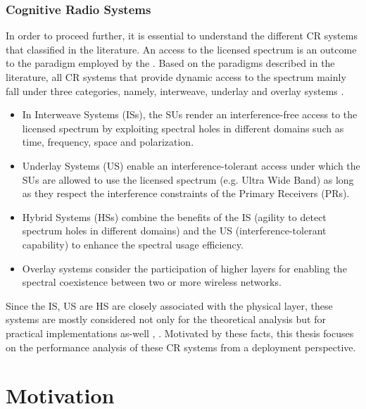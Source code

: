 \subsubsection*{Cognitive Radio Systems}
In order to proceed further, it is essential to understand the different CR systems that classified in the literature. An access to the licensed spectrum is an outcome to the paradigm employed by the . Based on the paradigms described in the literature, all CR systems that provide dynamic access to the spectrum mainly fall under three categories, namely, interweave, underlay and overlay systems \cite{Goldsmith09}. 
\begin{itemize}
\item In Interweave Systems (ISs), the SUs render an interference-free access to the licensed spectrum by exploiting spectral holes in different domains such as time, frequency, space and polarization. 
\item Underlay Systems (US) enable an interference-tolerant access under which the SUs are allowed to use the licensed spectrum (e.g. Ultra Wide Band) as long as they respect the interference constraints of the Primary Receivers (PRs). 
\item Hybrid Systems (HSs) combine the benefits of the IS (agility to detect spectrum holes in different domains) and the US (interference-tolerant capability) to enhance the spectral usage efficiency.  
\item Overlay systems consider the participation of higher layers for enabling the spectral coexistence between two or more wireless networks. 
\end{itemize}
Since the IS, US are HS are closely associated with the physical layer, these systems are mostly considered not only for the theoretical analysis but for practical implementations as-well , \cite{Cabric06, Kim10}. Motivated by these facts, this thesis focuses on the performance analysis of these CR systems from a deployment perspective. 


\section{Motivation}
\label{sec:mot}


